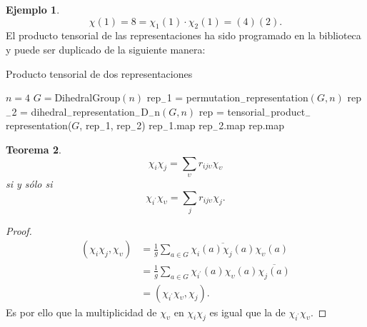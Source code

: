 \documentclass[12pt]{book}
\newtheorem{theorem}{Teorema}[section]
\theoremstyle{definition}
\newtheorem{example}[theorem]{Ejemplo}
\newcounter{in}
\begin{document}
\begin{example}
\[\]
$$\chi(1)= 8 = \chi_{1}(1) \cdot \chi_{2}(1) = (4)(2). $$
El producto tensorial de las representaciones ha sido programado en la
biblioteca y puede ser duplicado de la siguiente manera:
\begin{algorithm}[H]
\caption{Producto tensorial de dos representaciones}
\begin{algorithmic}
\REQUIRE $n = 4$
\REQUIRE $G = $DihedralGroup$(n)$
\STATE rep$_{-}$1 = permutation$_{-}$representation$(G, n)$
\STATE rep$_{-}$2 = dihedral$_{-}$representation$_{-}$D$_{-}$n$(G,n)$
\STATE rep = tensorial$_{-}$product$_{-}$representation($G$, rep$_{-}$1, rep$_{-}$2)
\PRINT rep$_{-}$1.map
\PRINT rep$_{-}$2.map
\PRINT rep.map
\end{algorithmic}
\end{algorithm}
\end{example}
\begin{theorem}
  \label{t6_2}
\begin{equation*}
  \chi_{i} \chi_{j} = \sum_{\upsilon} r_{ij \upsilon} \chi_{\upsilon}
\end{equation*}
si y sólo si
\begin{equation*}
  \chi_{i^{'}}\chi_{\upsilon} =  \sum_{j} r_{ij \upsilon} \chi_{j}.
\end{equation*}
\end{theorem}
\begin{proof}
  \begin{equation}
    \label{eq:5}
    \begin{aligned}
      (\chi_{i} \chi_{j}, \chi_{\upsilon}) &= \frac{1}{g} \sum_{a \in G} \overline{\chi_{i}(a) \chi_{j}(a)} \chi_{\upsilon}(a) \\
      & = \frac{1}{g} \sum_{a \in G} \chi_{i^{'}}(a) \chi_{\upsilon}(a) \overline{\chi_{j}(a)} \\
      & = (\chi_{i^{'}} \chi_{\upsilon},\chi_{j}).
    \end{aligned}
  \end{equation}
  Es por ello que la multiplicidad de $\chi_{\upsilon}$ en
  $\chi_{i} \chi_{j}$ es igual que la de
  $\chi_{i^{'}} \chi_{\upsilon}$.  
\end{proof}
\end{document}
